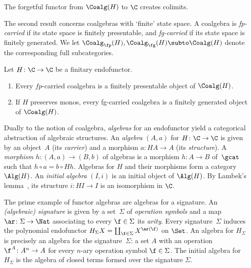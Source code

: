 \begin{notheorembrackets}
\begin{lemma}\label{lem:colimits-coalg}
The forgetful functor from $\Coalg(H)$ to $\C$ creates colimits.
\end{lemma}
\end{notheorembrackets}

The second result concerns coalgebras with `finite' state space. A coalgebra is \emph{fp-carried} if its state space is finitely presentable, and \emph{fg-carried} if its state space is finitely generated. We let $\Coalg_\fp(H), \Coalg_\fg(H)\subto \Coalg(H)$ denote the corresponding full subcategories. 

\begin{notheorembrackets}
\begin{lemma}[{\cite[Lem.~3.2]{ap04}}]\label{lem:fp-fg-coalg} Let $H\colon \C\to \C$ be a finitary endofunctor.
\begin{enumerate}
\item Every $fp$-carried coalgebra is a finitely presentable object of $\Coalg(H)$.
\item If $H$ preserves monos, every fg-carried coalgebra is a finitely generated object of $\Coalg(H)$.
\end{enumerate}
\end{lemma}
\end{notheorembrackets}

Dually to the notion of coalgebra, \emph{algebras} for an endofunctor yield a categorical abstraction of algebraic structures. An \emph{algebra} $(A,a)$ for $H\colon \C\to \C$ is given by an object~$A$ (its \emph{carrier}) and a morphism $a\colon H A\to A$ (its \emph{structure}). A
\emph{morphism} $h\colon (A,a) \to (B,b)$ of algebras is a morphism
$h\colon A\to B$ of~$\gcat$ such that $h\circ a = b\circ H h$.  Algebras
for $H$ and their morphisms form a category $\Alg(H)$. An \emph{initial algebra} $(I,i)$ is an initial object of $\Alg(H)$. By Lambek's lemma~\cite{lambek68}, its structure $i\colon HI\to I$ is an isomorphism in $\C$.



\begin{example}
The prime example of functor algebras are algebras for a
signature. An \emph{(algebraic) signature} is given by a set~$\Sigma$
of \emph{operation symbols} and a map $\ar\colon \Sigma\to \Nat$
associating to every $\f\in \Sigma$ its \emph{arity}. Every
signature~$\Sigma$ induces the polynomial endofunctor $H_\Sigma X = \coprod_{\f\in \Sigma} X^{\ar(\f)}$ on $\Set$. An algebra for $H_\Sigma$ is
precisely an algebra for the signature~$\Sigma$: a set $A$ with an operation $\f^A\colon A^n\to A$ for every $n$-ary operation symbol $\f\in \Sigma$. The initial algebra for $H_\Sigma$ is the algebra of closed terms formed over the signature $\Sigma$.
\end{example}




